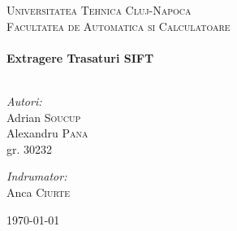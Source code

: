 \begin{titlepage}
\begin{center}

\textsc{\LARGE Universitatea Tehnica Cluj-Napoca}\\[1.5cm]

\textsc{\Large Facultatea de Automatica si Calculatoare}\\[0.5cm]

\HRule \\[0.4cm]
{ \huge \bfseries Extragere Trasaturi SIFT}\\[0.4cm]

\HRule \\[1.5cm]

\begin{minipage}[t]{0.4\textwidth}
\begin{flushleft} \large
\emph{Autori:}\\
Adrian \textsc{Soucup}\\
Alexandru \textsc{Pana}\\
gr. 30232
\end{flushleft}
\end{minipage}
\begin{minipage}[t]{0.4\textwidth}
\begin{flushright} \large
\emph{Indrumator:} \\
Anca \textsc{Ciurte}
\end{flushright}
\end{minipage}
\vfill

{\large \today}

\end{center}
\end{titlepage}